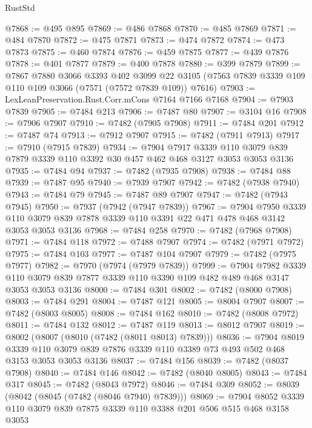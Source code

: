 \begin{lexlean}{RustStd}
\begin{coremodule}
{\begin{coremodule}
{{{{{{{{{{{{{{{{{{{{{{{{{{{{{{{{@7868 := @495 @895
@7869 := @486 @7868
@7870 := @485 @7869
@7871 := @484 @7870
@7872 := @475 @7871
@7873 := @474 @7872
@7874 := @473 @7873
@7875 := @460 @7874
@7876 := @459 @7875
@7877 := @439 @7876
@7878 := @401 @7877
@7879 := @400 @7878
@7880 := @399 @7879
@7899 := @7867
    @7880
    @3066
    @3393
    @402
    @3099
    @22
    @3105
    (@7563 @7839 @3339 @109 @110 @109 @3066 (@7571 (@7572 @7839 @109)) @7616)
@7903 := LexLeanPreservation.Rust.Corr.mCons @7164 @7166 @7168
@7904 := @7903 @7839
@7905 := @7484 @213
@7906 := @7487 @80
@7907 := @3104 @16
@7908 := @7906 @7907
@7910 := @7482 (@7905 @7908)
@7911 := @7484 @201
@7912 := @7487 @74
@7913 := @7912 @7907
@7915 := @7482 (@7911 @7913)
@7917 := @7910 (@7915 @7839)
@7934 := @7904
    @7917
    @3339
    @110
    @3079
    @839
    @7879
    @3339
    @110
    @3392
    @30
    @457
    @462
    @468
    @3127
    @3053
    @3053
    @3136
@7935 := @7484 @94
@7937 := @7482 (@7935 @7908)
@7938 := @7484 @88
@7939 := @7487 @95
@7940 := @7939 @7907
@7942 := @7482 (@7938 @7940)
@7943 := @7484 @79
@7945 := @7487 @89 @7907
@7947 := @7482 (@7943 @7945)
@7950 := @7937 (@7942 (@7947 @7839))
@7967 := @7904
    @7950
    @3339
    @110
    @3079
    @839
    @7878
    @3339
    @110
    @3391
    @22
    @471
    @478
    @468
    @3142
    @3053
    @3053
    @3136
@7968 := @7484 @258
@7970 := @7482 (@7968 @7908)
@7971 := @7484 @118
@7972 := @7488 @7907
@7974 := @7482 (@7971 @7972)
@7975 := @7484 @103
@7977 := @7487 @104 @7907
@7979 := @7482 (@7975 @7977)
@7982 := @7970 (@7974 (@7979 @7839))
@7999 := @7904
    @7982
    @3339
    @110
    @3079
    @839
    @7877
    @3339
    @110
    @3390
    @109
    @482
    @489
    @468
    @3147
    @3053
    @3053
    @3136
@8000 := @7484 @301
@8002 := @7482 (@8000 @7908)
@8003 := @7484 @291
@8004 := @7487 @121
@8005 := @8004 @7907
@8007 := @7482 (@8003 @8005)
@8008 := @7484 @162
@8010 := @7482 (@8008 @7972)
@8011 := @7484 @132
@8012 := @7487 @119
@8013 := @8012 @7907
@8019 := @8002 (@8007 (@8010 (@7482 (@8011 @8013) @7839)))
@8036 := @7904
    @8019
    @3339
    @110
    @3079
    @839
    @7876
    @3339
    @110
    @3389
    @73
    @493
    @502
    @468
    @3153
    @3053
    @3053
    @3136
@8037 := @7484 @156
@8039 := @7482 (@8037 @7908)
@8040 := @7484 @146
@8042 := @7482 (@8040 @8005)
@8043 := @7484 @317
@8045 := @7482 (@8043 @7972)
@8046 := @7484 @309
@8052 := @8039 (@8042 (@8045 (@7482 (@8046 @7940) @7839)))
@8069 := @7904
    @8052
    @3339
    @110
    @3079
    @839
    @7875
    @3339
    @110
    @3388
    @201
    @506
    @515
    @468
    @3158
    @3053
}}}}}}}}}}}}}}}}}}}}}}}}}}}}}}}}
\end{coremodule}}
\end{coremodule}
\end{lexlean}
